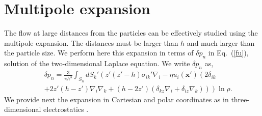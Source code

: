 \section{Multipole expansion}


The flow at large distances from the particles can be  effectively studied using the multipole expansion. The distances must be larger than $h$ and much larger than the particle size.
We perform here this expansion in terms of $\delta p_n$ in Eq.~(\ref{fu}), solution of the two-dimensional
Laplace equation. We write $\delta p_n$ as,
\begin{eqnarray}&&\!\!\!\!\!\!\!\!\!
\delta p_n=\frac{3}{\pi h^3}\int_{S_n}dS_k' \left(
z'(z'-h) \sigma_{ik}'\nabla_i-\eta u_{i}(\bm x')\left(
2\delta_{ik}\nonumber\right.\right.\\&&\!\!\!\!\!\!\!\!\!\left.\left.+2z'(h\!-\!z')\nabla_i \nabla_k
+(h\!-\!2z')
\left(\delta_{kz}\nabla_i+\delta_{iz}\nabla_k \right)\right)\right)\ln \rho.\label{deltap}
\end{eqnarray}
We provide next the expansion 
in Cartesian and polar coordinates  
as in three-dimensional electrostatics \citep{cl}.

